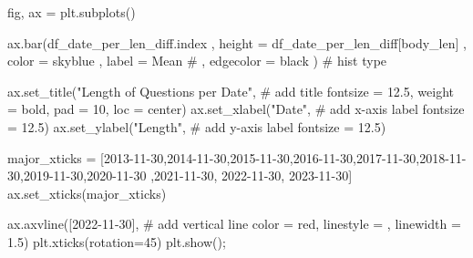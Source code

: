 \documentclass[
  letterpaper,
  DIV=11,
  numbers=noendperiod]{scrartcl}
\newenvironment{Shaded}{\begin{snugshade}}{\end{snugshade}}
\newcommand{\CommentTok}[1]{\textcolor[rgb]{0.37,0.37,0.37}{#1}}
\newcommand{\DecValTok}[1]{\textcolor[rgb]{0.68,0.00,0.00}{#1}}
\newcommand{\FloatTok}[1]{\textcolor[rgb]{0.68,0.00,0.00}{#1}}
\newcommand{\NormalTok}[1]{\textcolor[rgb]{0.00,0.23,0.31}{#1}}
\newcommand{\OperatorTok}[1]{\textcolor[rgb]{0.37,0.37,0.37}{#1}}
\newcommand{\StringTok}[1]{\textcolor[rgb]{0.13,0.47,0.30}{#1}}
\begin{document}
\begin{Shaded}
\begin{Highlighting}[]
\NormalTok{fig, ax }\OperatorTok{=}\NormalTok{ plt.subplots()}


\NormalTok{ax.bar(df\_date\_per\_len\_diff.index}
\NormalTok{    ,  height }\OperatorTok{=}\NormalTok{ df\_date\_per\_len\_diff[}\StringTok{\textquotesingle{}body\_len\textquotesingle{}}\NormalTok{]}
\NormalTok{    ,  color }\OperatorTok{=} \StringTok{\textquotesingle{}skyblue\textquotesingle{}}
\NormalTok{    ,  label }\OperatorTok{=} \StringTok{\textquotesingle{}Mean\textquotesingle{}}
    \CommentTok{\# ,  edgecolor = \textquotesingle{}black\textquotesingle{}}
\NormalTok{      ) }\CommentTok{\# hist type}

\NormalTok{ax.set\_title(}\StringTok{"Length of Questions per Date"}\NormalTok{, }\CommentTok{\# add title}
\NormalTok{             fontsize }\OperatorTok{=} \FloatTok{12.5}\NormalTok{,}
\NormalTok{             weight }\OperatorTok{=} \StringTok{\textquotesingle{}bold\textquotesingle{}}\NormalTok{,}
\NormalTok{             pad }\OperatorTok{=} \DecValTok{10}\NormalTok{,}
\NormalTok{             loc }\OperatorTok{=} \StringTok{\textquotesingle{}center\textquotesingle{}}\NormalTok{)}
\NormalTok{ax.set\_xlabel(}\StringTok{"Date"}\NormalTok{, }\CommentTok{\# add x{-}axis label}
\NormalTok{              fontsize }\OperatorTok{=} \FloatTok{12.5}\NormalTok{)}
\NormalTok{ax.set\_ylabel(}\StringTok{"Length"}\NormalTok{, }\CommentTok{\# add y{-}axis label}
\NormalTok{              fontsize }\OperatorTok{=} \FloatTok{12.5}\NormalTok{)}

\NormalTok{major\_xticks }\OperatorTok{=}\NormalTok{ [}\StringTok{\textquotesingle{}2013{-}11{-}30\textquotesingle{}}\NormalTok{,}\StringTok{\textquotesingle{}2014{-}11{-}30\textquotesingle{}}\NormalTok{,}\StringTok{\textquotesingle{}2015{-}11{-}30\textquotesingle{}}\NormalTok{,}\StringTok{\textquotesingle{}2016{-}11{-}30\textquotesingle{}}\NormalTok{,}\StringTok{\textquotesingle{}2017{-}11{-}30\textquotesingle{}}\NormalTok{,}\StringTok{\textquotesingle{}2018{-}11{-}30\textquotesingle{}}\NormalTok{,}\StringTok{\textquotesingle{}2019{-}11{-}30\textquotesingle{}}\NormalTok{,}\StringTok{\textquotesingle{}2020{-}11{-}30\textquotesingle{}}
\NormalTok{                ,}\StringTok{\textquotesingle{}2021{-}11{-}30\textquotesingle{}}\NormalTok{, }\StringTok{\textquotesingle{}2022{-}11{-}30\textquotesingle{}}\NormalTok{, }\StringTok{\textquotesingle{}2023{-}11{-}30\textquotesingle{}}\NormalTok{]}
\NormalTok{ax.set\_xticks(major\_xticks)}

\NormalTok{ax.axvline([}\StringTok{\textquotesingle{}2022{-}11{-}30\textquotesingle{}}\NormalTok{], }\CommentTok{\# add vertical line}
\NormalTok{           color }\OperatorTok{=} \StringTok{\textquotesingle{}red\textquotesingle{}}\NormalTok{,}
\NormalTok{           linestyle }\OperatorTok{=} \StringTok{\textquotesingle{}{-}{-}\textquotesingle{}}\NormalTok{,}
\NormalTok{           linewidth }\OperatorTok{=} \FloatTok{1.5}\NormalTok{)}
\NormalTok{plt.xticks(rotation}\OperatorTok{=}\DecValTok{45}\NormalTok{)}
\NormalTok{plt.show()}\OperatorTok{;}
\end{Highlighting}
\end{Shaded}
\end{document}
